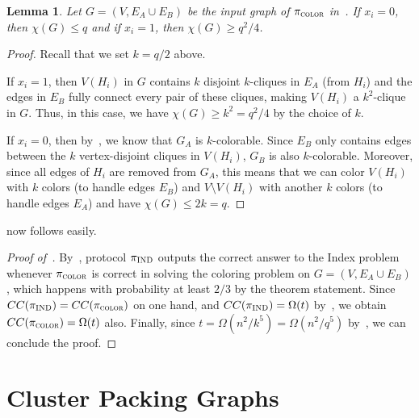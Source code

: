 \documentclass[11pt]{article}
\newtheorem{lemma}{Lemma}[section]
\theoremstyle{definition}
\renewcommand{\leq}{\leqslant}
\renewcommand{\geq}{\geqslant}
\newcommand{\prot}{\ensuremath{\pi}}
\newcommand{\protindex}{\ensuremath{\prot_{\textnormal{\textsc{IND}}}}}
\begin{document}
\begin{lemma}\label{lem:two-player-reduction}
	Let $G=(V,E_A \cup E_B)$ be the input graph of $\pi_{\textsc{color}}$ in~. If $x_i = 0$, then $\chi(G) \leq q$ and if $x_i = 1$, then $\chi(G) \geq q^2/4$. 
\end{lemma}
\begin{proof}
	Recall that we set $k=q/2$ above. 
     
    If $x_i=1$, then $V(H_i)$ in $G$ contains $k$ disjoint $k$-cliques in $E_A$ (from $H_i$) and the edges in $E_B$ fully connect every pair of these cliques, making $V(H_i)$ a $k^2$-clique in $G$. 
    Thus, in this case, we have $\chi(G) \geq k^2 = q^2/4$ by the choice of $k$. 
    
    If $x_i=0$, then by~, we know that $G_A$ is $k$-colorable. Since $E_B$ only contains edges between the $k$ vertex-disjoint cliques in $V(H_i)$, $G_B$ is also $k$-colorable. Moreover, since all edges of $H_i$ are removed
    from $G_A$, this means that we can color $V(H_i)$ with $k$ colors (to handle edges $E_B$) and $V \setminus V(H_i)$ with another $k$ colors  (to handle edges $E_A$) and have $\chi(G) \leq 2k = q$. 
\end{proof}

 now follows easily. 

\begin{proof}[Proof of~]
	By~, protocol $\protindex$ outputs the correct answer to the Index problem whenever $\pi_{\textsc{color}}$ is correct in solving the coloring problem on $G = (V, E_A \cup E_B)$, 
	which happens with probability at least $2/3$ by the theorem statement. Since $CC(\protindex) = CC(\protcolor)$ on one hand, and $CC(\protindex) = \Omega(t)$ by~, 
	we obtain $CC(\pi_{\textsc{color}}) = \Omega(t)$ also. Finally, since $t = \Omega(n^2/k^5) = \Omega(n^2/q^5)$ by~, we can conclude the proof. 
\end{proof}%
	
	\clearpage


\newcommand{\LijS}[3]{\ensuremath{L^{(#1)}_{#2}(#3)}}

\section{Cluster Packing Graphs}\label{sec:stronger-cluster-packing}
\end{document}
